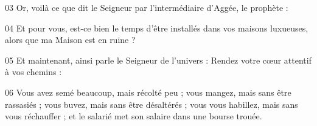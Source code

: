 
03 Or, voilà ce que dit le Seigneur par l’intermédiaire d’Aggée, le prophète :

04 Et pour vous, est-ce bien le temps d’être installés dans vos maisons luxueuses, alors que ma Maison est en ruine ?

05 Et maintenant, ainsi parle le Seigneur de l’univers : Rendez votre cœur attentif à vos chemins :

06 Vous avez semé beaucoup, mais récolté peu ; vous mangez, mais sans être rassasiés ; vous buvez, mais sans être désaltérés ; vous vous habillez, mais sans vous réchauffer ; et le salarié met son salaire dans une bourse trouée.
